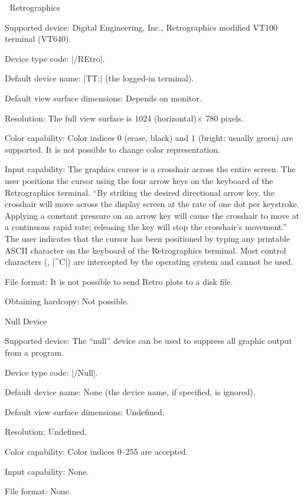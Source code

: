  
\beginsection Retrographics 

\proclaim Supported device:  Digital Engineering, Inc., Retrographics
modified VT100 terminal (VT640).

\proclaim Device type code: |/REtro|. 

\proclaim Default device name: |TT:| (the logged-in terminal). 

\proclaim Default view surface dimensions: Depends on monitor. 

\proclaim Resolution: The full view surface is 1024 (horizontal)$\times$ 
780 pixels. 

\proclaim Color capability: Color indices 0 (erase, black) and 1
(bright: usually green) are supported. It is not possible to change
color representation. 

\proclaim Input capability: The graphics cursor is a crosshair across
the entire screen. The user positions the cursor using the four arrow
keys on the keyboard of the Retrographics terminal. ``By striking the
desired directional arrow key, the crosshair will move across the
display screen at the rate of one dot per keystroke. Applying a constant
pressure on an arrow key will cause the crosshair to move at a
continuous rapid rate; releasing the key will stop the crosshair's
movement.'' The user indicates that the cursor has been positioned by
typing any printable ASCII character on the keyboard of the
Retrographics terminal. Most control characters (\eg, |^C|) are
intercepted by the operating system and cannot be used. 

\proclaim File format: It is not possible to send Retro plots to a disk
file. 

\proclaim Obtaining hardcopy: Not possible. 


\beginsection Null Device

\proclaim Supported device: The ``null'' device can be used to suppress
all graphic output from a program.  

\proclaim Device type code: |/Null|.

\proclaim Default device name: None (the device name, if specified, is 
ignored).

\proclaim Default view surface dimensions: Undefined.

\proclaim Resolution: Undefined.

\proclaim Color capability: Color indices 0--255 are accepted.

\proclaim Input capability: None.

\proclaim File format: None.

